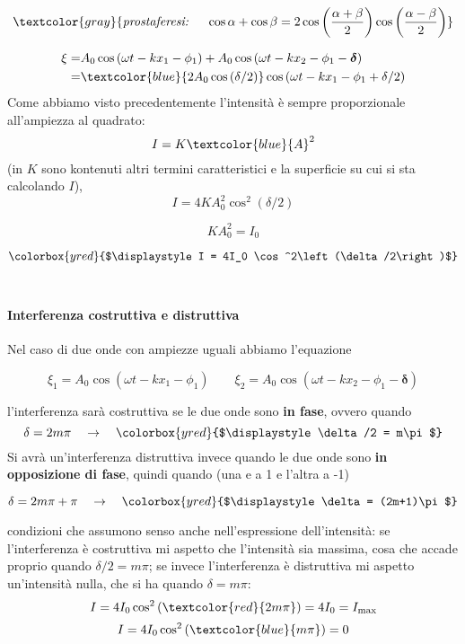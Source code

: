 \documentclass[x11names]{article}
\newcommand{\viola}[1]{\colorbox{yred}{$\displaystyle #1$}}
\begin{document}
		\[
		\textcolor{gray}{\textit{prostaferesi: } \quad \cos\alpha + \cos\beta = 2\cos\left(\frac{\alpha + \beta}{2}\right)\cos\left(\frac{\alpha - \beta}{2}\right)}
		\]
		
		\begin{align*}
			\xi =& A_0\cos\left(\omega t - kx_1 - \phi_1\right) + A_0\cos\left(\omega t - kx_2 - \phi_1 - \boldsymbol{\delta}\right)\\
				=& \textcolor{blue}{2A_0\cos\left(\delta/2\right)}\cos\left(\omega t - kx_1 - \phi_1+\delta/2\right)
		\end{align*}
		Come abbiamo visto precedentemente l'intensità è sempre proporzionale all'ampiezza al quadrato:
		\[ 
		I = K\textcolor{blue}{A}^2
		\]
		(in \(K\) sono kontenuti altri termini caratteristici e la superficie su cui si sta calcolando \(I\)),
		\[ 
		I = 4KA_0^2 \cos^2\left(\delta/2\right)
		\]
		
		\[ 
		\boxed{KA_0^2 = I_0}
		\]
		
		\begin{equation}
				\viola{I = 4I_0 \cos^2\left(\delta/2\right)}
		\end{equation} \\
		
		\begin{es}{}
			\paragraph{Interferenza costruttiva e distruttiva}
			Nel caso di due onde con ampiezze uguali abbiamo l'equazione 
			
			\[ 
			\xi_1 = A_0\cos\left(\omega t - kx_1 - \phi_1\right)
			\qquad
			\xi_2 = A_0\cos\left(\omega t - kx_2 - \phi_1 - \boldsymbol{\delta}\right)
			\] 
			
			l'interferenza sarà costruttiva se le due onde sono \textbf{in fase}, ovvero quando 
			\[ 
			\delta = 2m\pi \quad \to \quad \viola{\delta/2 = m\pi }
			\]
			Si avrà un'interferenza distruttiva invece quando le due onde sono \textbf{in opposizione di fase}, quindi quando (una e a 1 e l'altra a -1)
			
			\[ 
			\delta = 2m\pi + \pi \quad \to \quad \viola{\delta = (2m+1)\pi }
			\]
			
			condizioni che assumono senso anche nell'espressione dell'intensità: se l'interferenza è costruttiva mi aspetto che l'intensità sia massima, cosa che accade proprio quando  \(\delta/2 = m\pi \); se invece l'interferenza è distruttiva mi aspetto un'intensità nulla, che si ha quando \(\delta = m\pi \):
			\[ 
			I = 4I_0 \cos^2\left(\textcolor{red}{2m\pi }\right) = 4I_0 = I_\text{max}
			\]
			\[ 
			I = 4I_0 \cos^2\left(\textcolor{blue}{m\pi }\right) = 0 
			\]
		\end{es}
		
\end{document}
